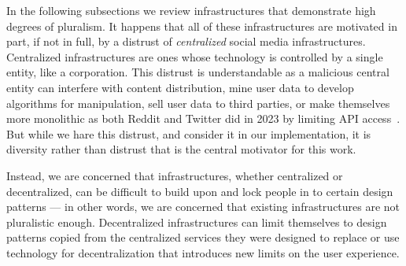 
In the following subsections we review infrastructures that demonstrate high degrees of pluralism.
It happens that all of these infrastructures are motivated in part, if not in full, by a distrust of \emph{centralized} social media infrastructures.
Centralized infrastructures are ones whose technology is controlled by a single entity, like a corporation.
This distrust is understandable as a malicious central entity
can interfere with content distribution, mine user data to develop algorithms for manipulation,
sell user data to third parties, or make themselves more monolithic as both Reddit and Twitter did in 2023 by limiting API access~\cite{ageofsurveillancecapitalism, platformsociety, standoutofourlight}.
But while we hare this distrust, and consider it in our implementation, it is diversity rather than distrust that is the central motivator for this work.

Instead, we are concerned that infrastructures, whether centralized or decentralized, can be difficult to build upon and lock people in to certain design patterns --- in other words, we are concerned that existing infrastructures are not pluralistic enough.
Decentralized infrastructures can limit themselves to design patterns copied from the centralized services they were designed to replace or use technology for decentralization that introduces new limits on the user experience.




